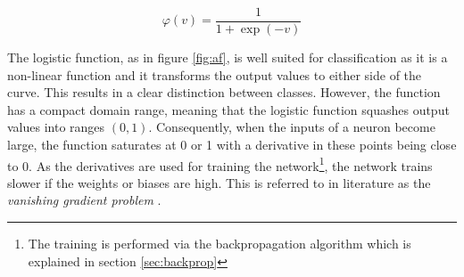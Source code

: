 \begin{equation}
 \varphi(v) = \frac{1}{1 + \exp(-v)} 
\end{equation}

The logistic function, as in figure \ref{fig:af}, is well suited for classification as it is a non-linear function and it transforms the output values to either side of the curve. This results in a clear distinction between classes. However, the function has a compact domain range, meaning that the logistic function squashes output values into ranges $(0, 1)$. Consequently, when the inputs of a neuron become large, the function saturates at 0 or 1 with a derivative in these points being close to 0. As the derivatives are used for training the network\footnote{The training is performed via the backpropagation algorithm which is explained in section \ref{sec:backprop}}, the network trains slower if the weights or biases are high. This is referred to in literature as the \textit{vanishing gradient problem} \cite{Nair:2010:RLU:3104322.3104425}.\\


